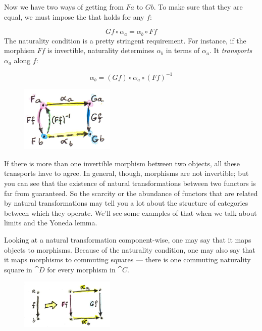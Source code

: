 \noindent
Now we have two ways of getting from $F a$ to $G b$. To
make sure that they are equal, we must impose the  that holds for any $f$:

\[G f \circ \alpha_a = \alpha_b \circ F f\]
The naturality condition is a pretty stringent requirement. For
instance, if the morphism $F f$ is invertible, naturality
determines $\alpha_b$ in terms of $\alpha_a$. It \emph{transports}
$\alpha_a$ along $f$:

\[\alpha_b = (G f) \circ \alpha_a \circ (F f)^{-1}\]

\begin{figure}[H]
\centering
\includegraphics[width=0.4\textwidth]{images/4_transport.jpg}
\end{figure}

\noindent
If there is more than one invertible morphism between two objects, all
these transports have to agree. In general, though, morphisms are not
invertible; but you can see that the existence of natural
transformations between two functors is far from guaranteed. So the
scarcity or the abundance of functors that are related by natural
transformations may tell you a lot about the structure of categories
between which they operate. We'll see some examples of that when we talk
about limits and the Yoneda lemma.

Looking at a natural transformation component-wise, one may say that it
maps objects to morphisms. Because of the naturality condition, one may
also say that it maps morphisms to commuting squares --- there is one
commuting naturality square in $\cat{D}$ for every morphism in $\cat{C}$.

\begin{figure}[H]
\centering
\includegraphics[width=0.4\textwidth]{images/naturality.jpg}
\end{figure}

